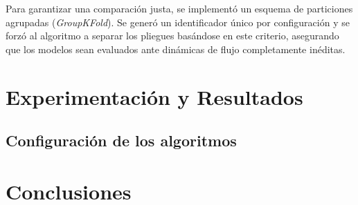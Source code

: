\documentclass[pdflatex,sn-mathphys-num]{sn-jnl}%
\theoremstyle{thmstyleone}
\theoremstyle{thmstyletwo}
\theoremstyle{thmstylethree}
\begin{document}
Para garantizar una comparación justa, se implementó un esquema de particiones agrupadas (\textit{GroupKFold}). Se generó un identificador único por configuración y se forzó al algoritmo a separar los pliegues basándose en este criterio, asegurando que los modelos sean evaluados ante dinámicas de flujo completamente inéditas.

\section{Experimentación y Resultados}\label{sec3}
\subsection{Configuración de los algoritmos}

\section{Conclusiones}\label{sec4}


\end{document}
